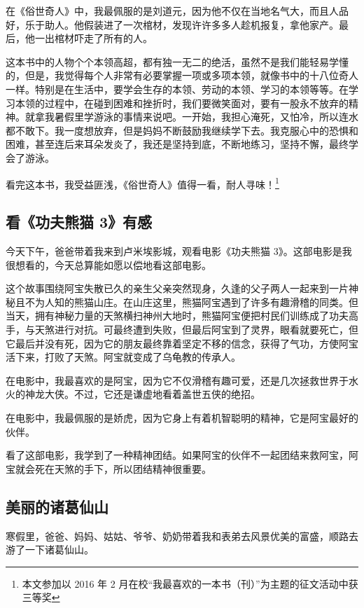 \documentclass[UTF8,a4paper,titlepage,twoside,10.5pt]{article}
\begin{document}
在《俗世奇人》中，我最佩服的是刘道元，因为他不仅在当地名气大，而且人品好，乐于助人。他假装进了一次棺材，发现许许多多人趁机报复，拿他家产。最后，他一出棺材吓走了所有的人。

这本书中的人物个个本领高超，都有独一无二的绝活，虽然不是我们能轻易学懂的，但是，我觉得每个人非常有必要掌握一项或多项本领，就像书中的十八位奇人一样。特别是在生活中，要学会生存的本领、劳动的本领、学习的本领等等。在学习本领的过程中，在碰到困难和挫折时，我们要微笑面对，要有一股永不放弃的精神。就拿我暑假里学游泳的事情来说吧。一开始，我担心淹死，又怕冷，所以连水都不敢下。我一度想放弃，但是妈妈不断鼓励我继续学下去。我克服心中的恐惧和困难，甚至连后来耳朵发炎了，我还是坚持到底，不断地练习，坚持不懈，最终学会了游泳。

看完这本书，我受益匪浅，《俗世奇人》值得一看，耐人寻味！\footnote{本文参加以 2016 年 2 月在校“我最喜欢的一本书（刊）”为主题的征文活动中获三等奖}

\subsection{看《功夫熊猫 3》有感}
\label{sec:orga0bfb0b}

今天下午，爸爸带着我来到卢米埃影城，观看电影《功夫熊猫 3》。这部电影是我很想看的，今天总算能如愿以偿地看这部电影。

这个故事围绕阿宝失散已久的亲生父亲突然现身，久逢的父子两人一起来到一片神秘且不为人知的熊猫山庄。在山庄这里，熊猫阿宝遇到了许多有趣滑稽的同类。但当天，拥有神秘力量的天煞横扫神州大地时，熊猫阿宝便把村民们训练成了功夫高手，与天煞进行对抗。可最终遭到失败，但最后阿宝到了灵界，眼看就要死亡，但它最后并没有死，因为它的朋友最终靠着坚定不移的信念，获得了气功，方使阿宝活下来，打败了天煞。阿宝就变成了乌龟教的传承人。

在电影中，我最喜欢的是阿宝，因为它不仅滑稽有趣可爱，还是几次拯救世界于水火的神龙大侠。不过，它还是谦虚地看着盖世五侠的绝招。

在电影中，我最佩服的是娇虎，因为它身上有着机智聪明的精神，它是阿宝最好的伙伴。

看了这部电影，我学到了一种精神团结。如果阿宝的伙伴不一起团结来救阿宝，阿宝就会死在天煞的手下，所以团结精神很重要。

\subsection{美丽的诸葛仙山}
\label{sec:org37631be}

寒假里，爸爸、妈妈、姑姑、爷爷、奶奶带着我和表弟去风景优美的富盛，顺路去游了一下诸葛仙山。
\end{document}
